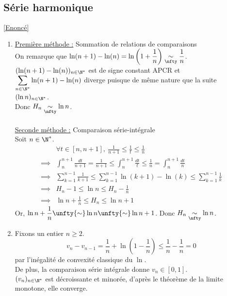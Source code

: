 \documentclass{book}
\begin{document}
	\subsection{Série harmonique }
	\label{Série harmonique corrigé}
	\textcolor{blue}{\hyperref[Série harmonique]{[Enoncé]}}\\
	\begin{enumerate}[leftmargin=*]
		\item \underline{Première méthode :} Sommation de relations de comparaisons\\
		On remarque que $\ln(n+1)-\ln(n)=\ln\left(1+\displaystyle\frac{1}{n}\right)\underset{\nfty}{\sim}\displaystyle\frac{1}{n}$.\\ $(\ln(n+1)-\ln(n))_{n\in \N^*}$ est de signe constant APCR et $\displaystyle\sum\limits_{n\in \N^*}{\ln(n+1)-\ln(n)}$ diverge puisque de même nature que la suite $(\ln n)_{n\in \N^*}$. \\
		Donc $H_n\underset{\nfty}{\sim}\ln n$.\\\\
		\underline{Seconde méthode :} Comparaison série-intégrale\\
		Soit $n\in \N^*$.
		\begin{align*}
			&\forall t\in [n,n+1],\ \frac{1}{n+1}\leq \frac{1}{t}\leq \frac{1}{n}\\
			\implies&\int_n^{n+1}\frac{dt}{n+1}=\frac{1}{n+1}\leq \int_n^{n+1}{\frac{dt}{t}}\leq \frac{1}{n}=\int_n^{n+1}{\frac{dt}{n}}\\
			\implies&\sum\limits_{k=1}^{n-1}{\frac{1}{k+1}}\leq \sum\limits_{k=1}^{n-1}{\ln(k+1)-\ln(k)}\leq\sum\limits_{k=1}^{n-1}{\frac{1}{k}}\\
			\implies&H_n-1\leq \ln n\leq H_n-\frac{1}{n}\\
			\implies&\ln n+\frac{1}{n}\leq H_n\leq \ln n+1
		\end{align*}
		Or, $\ln n+\displaystyle\frac{1}{n}\unfty{\sim} \ln n\unfty{\sim}\ln n+1$. Donc $H_n\underset{\nfty}{\sim}\ln n$.
		\item Fixons un entier $n\geq 2$.\\
		\[v_n-v_{n-1}=\displaystyle\frac{1}{n}+\ln\left(1-\displaystyle\frac{1}{n}\right)\leq \displaystyle\frac{1}{n}-\displaystyle\frac{1}{n}=0\] par l'inégalité de convexité classique du $\ln$.\\
		De plus, la comparaison série intégrale donne $v_n\in [0,1]$.\\
		$(v_n)_{n\in \N^*}$ est décroissante et minorée, d'après le théorème de la limite monotone, elle converge.\\

\end{enumerate}
\end{document}
